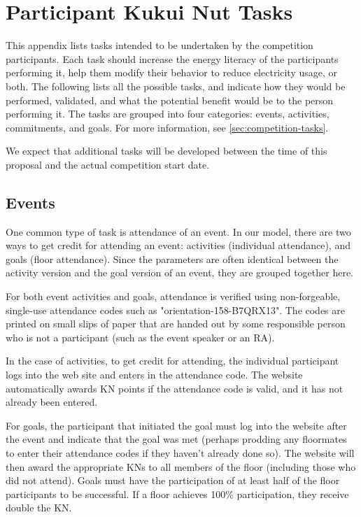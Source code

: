 \chapter{Participant Kukui Nut Tasks}
\label{app:tasks}

This appendix lists tasks intended to be undertaken by the competition participants. Each task should increase the energy literacy of the participants performing it, help them modify their behavior to reduce electricity usage, or both. The following lists all the possible tasks, and indicate how they would be performed, validated, and what the potential benefit would be to the person performing it. The tasks are grouped into four categories: events, activities, commitments, and goals. For more information, see \autoref{sec:competition-tasks}.

We expect that additional tasks will be developed between the time of this proposal and the actual competition start date.


\section{Events}

One common type of task is attendance of an event. In our model, there are two ways to get credit for attending an event: activities (individual attendance), and goals (floor attendance). Since the parameters are often identical between the activity version and the goal version of an event, they are grouped together here.

For both event activities and goals, attendance is verified using non-forgeable, single-use attendance codes such as "orientation-158-B7QRX13". The codes are printed on small slips of paper that are handed out by some responsible person who is not a participant (such as the event speaker or an RA).

In the case of activities, to get credit for attending, the individual participant logs into the web site and enters in the attendance code. The website automatically awards KN points if the attendance code is valid, and it has not already been entered.

For goals, the participant that initiated the goal must log into the website after the event and indicate that the goal was met (perhaps prodding any floormates to enter their attendance codes if they haven't already done so). The website will then award the appropriate KNs to all members of the floor (including those who did not attend). Goals must have the participation of at least half of the floor participants to be successful. If a floor achieves 100\% participation, they receive double the KN.


